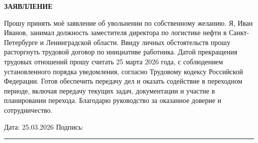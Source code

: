 \documentclass[12pt]{article}
\begin{document}
\begin{center}
\textbf{\LARGE ЗАЯВЛЛЕНИЕ}
\end{center}

\vspace{1cm}

Прошу принять моё заявление об увольнении по собственному желанию. Я, Иван Иванов, занимал должность заместителя директора по логистике нефти в Санкт-Петербурге и Ленинградской области. Ввиду личных обстоятельств прошу расторгнуть трудовой договор по инициативе работника. Датой прекращения трудовых отношений прошу считать 25 марта 2026 года, с соблюдением установленного порядка уведомления, согласно Трудовому кодексу Российской Федерации. Готов обеспечить передачу дел и оказать содействие в переходном периоде, включая передачу текущих задач, документации и участие в планировании перехода. Благодарю руководство за оказанное доверие и сотрудничество.

\vfill

\noindent
Дата: 25.03.2026 \hfill Подпись: \rule{5cm}{0.4pt}
\end{document}
